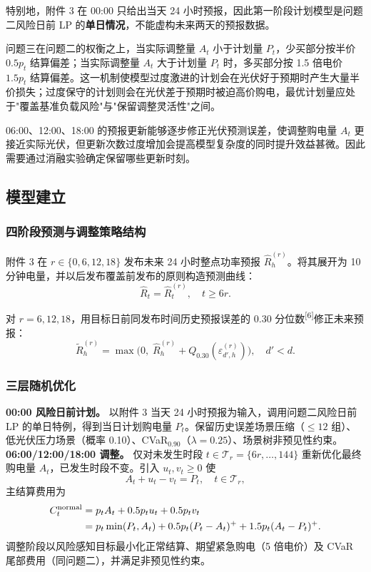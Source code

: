 \documentclass[withoutpreface,bwprint]{cumcmthesis} %
\begin{document}
特别地，附件 3 在 00:00 只给出当天 24 小时预报，因此第一阶段计划模型是问题二风险日前 LP 的\textbf{单日情况}，不能虚构未来两天的预报数据。

问题三在问题二的权衡之上，当实际调整量 $A_t$ 小于计划量 $P_t$，少买部分按半价 $0.5p_t$ 结算偏差；当实际调整量 $A_t$ 大于计划量 $P_t$ 时，多买部分按 1.5 倍电价 $1.5p_t$ 结算偏差。这一机制使模型过度激进的计划会在光伏好于预期时产生大量半价损失；过度保守的计划则会在光伏差于预期时被迫高价购电，最优计划量应处于"覆盖基准负载风险"与"保留调整灵活性"之间。

06:00、12:00、18:00 的预报更新能够逐步修正光伏预测误差，使调整购电量 $A_t$ 更接近实际光伏，但更新次数过度增加会提高模型复杂度的同时提升效益甚微。因此需要通过消融实验确定保留哪些更新时刻。

\subsection{模型建立}

\subsubsection{四阶段预测与调整策略结构}

附件 3 在 $r\in\{0,6,12,18\}$ 发布未来 24 小时整点功率预报 $\hat R_h^{(r)}$。将其展开为 10 分钟电量，并以后发布覆盖前发布的原则构造预测曲线：
\begin{equation}
\hat R_t=\hat R_t^{(r)}, \quad t\ge 6r.
\end{equation}

对 $r=6,12,18$，用目标日前同发布时间历史预报误差的 0.30 分位数\textsuperscript{[6]}修正未来预报：
\begin{equation}
\tilde R_h^{(r)} = \max\bigl(0,\;\hat R_h^{(r)}+Q_{0.30}(\varepsilon_{d',h}^{(r)})\bigr), \quad d'<d.
\end{equation}

\subsubsection{三层随机优化}

\textbf{00:00 风险日前计划。} 以附件 3 当天 24 小时预报为输入，调用问题二风险日前 LP 的单日特例，得到当日计划购电量 $P_t$。保留历史误差场景压缩（$\le12$ 组）、低光伏压力场景（概率 0.10）、CVaR$_{0.90}$（$\lambda=0.25$）、场景树非预见性约束。
\textbf{06:00/12:00/18:00 调整。} 仅对未发生时段 $t\in\mathcal T_r=\{6r,\dots,144\}$ 重新优化最终购电量 $A_t$，已发生时段不变。引入 $u_t,v_t\ge0$ 使
\begin{equation}
A_t+u_t-v_t=P_t,\quad t\in\mathcal T_r,
\end{equation}
主结算费用为
\begin{equation}
\begin{aligned}
C_t^{\rm normal}
&=p_tA_t+0.5p_tu_t+0.5p_tv_t\\
&=p_t\min(P_t,A_t)+0.5p_t(P_t-A_t)^+
 +1.5p_t(A_t-P_t)^+.
\end{aligned}
\end{equation}
\vspace{5pt}
调整阶段以风险感知目标最小化正常结算、期望紧急购电（5 倍电价）及 CVaR 尾部费用（同问题二），并满足非预见性约束。
\end{document}

